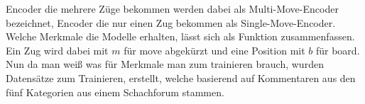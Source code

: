 Encoder die mehrere Züge bekommen werden dabei als Multi-Move-Encoder bezeichnet, Encoder die nur einen Zug bekommen als Single-Move-Encoder.\\

Welche Merkmale die Modelle erhalten, lässt sich als Funktion zusammenfassen. Ein Zug wird dabei mit $m$ für move abgekürzt und eine Position mit $b$ für board.\\

Nun da man weiß was für Merkmale man zum trainieren brauch, wurden Datensätze zum Trainieren, erstellt, welche basierend auf Kommentaren aus den fünf Kategorien aus einem Schachforum stammen.
